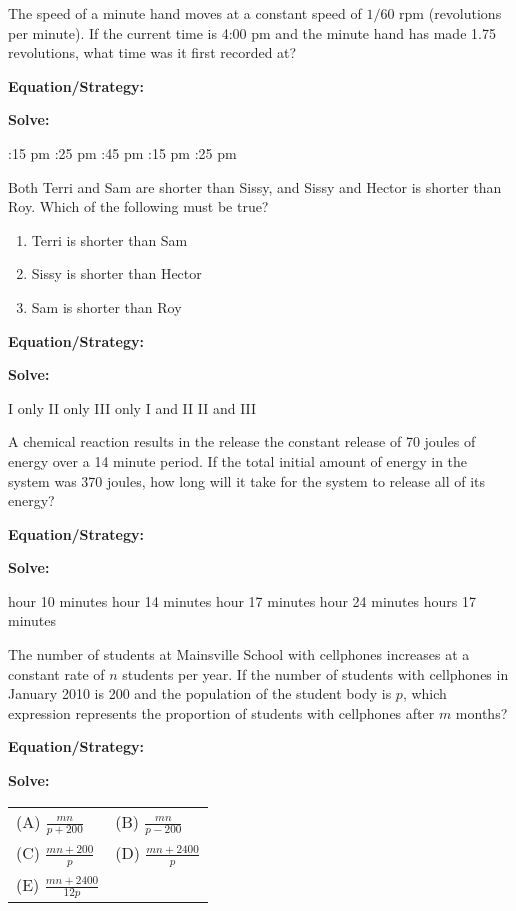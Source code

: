 \vfill
\newpage
\begin{multicols*}{2}
\begin{outline}[enumerate]
\medium

\1 The speed of a minute hand moves at a constant speed of $1/60$ rpm (revolutions per minute). If the current time is 4:00 pm and the minute hand has made 1.75 revolutions, what time was it first recorded at?

\bigskip
\textbf{Equation/Strategy:} \hrulefill

\bigskip
\textbf{Solve:}

\vfill
{}:15 pm
:25 pm
:45 pm
:15 pm
:25 pm

\midline

\1 Both Terri and Sam are shorter than Sissy, and Sissy and Hector is shorter than Roy. Which of the following must be true?

\begin{enumerate}[label=\Roman*.]
\item Terri is shorter than Sam
\item Sissy is shorter than Hector
\item Sam is shorter than Roy
\end{enumerate}

\bigskip
\textbf{Equation/Strategy:} \hrulefill

\bigskip
\textbf{Solve:}

\vfill
\2 I only
\2 II only
\2 III only
\2 I and II
\2 II and III

\columnbreak
\advanced

\1 A chemical reaction results in the release the constant release of 70 joules of energy over a 14 minute period. If the total initial amount of energy in the system was 370 joules, how long will it take for the system to release all of its energy?

\bigskip
\textbf{Equation/Strategy:} \hrulefill

\bigskip
\textbf{Solve:}

\vfill
{} hour 10 minutes
 hour 14 minutes
 hour 17 minutes
 hour 24 minutes
 hours 17 minutes

\midline

\1 The number of students at Mainsville School with cellphones increases at a constant rate of $n$ students per year. If the number of students with cellphones in January 2010 is 200 and the population of the student body is $p$, which expression represents the proportion of students with cellphones after $m$ months?

\bigskip
\textbf{Equation/Strategy:} \hrulefill

\textbf{Solve:}

\vfill
\begin{spacing}{2.75}
\begin{tabularx}{0.4\textwidth}{*2{@{}X}}
(A) $\frac{mn}{p+200}$ & (B) $\frac{mn}{p-200}$\\
(C) $\frac{mn+200}{p}$ & (D) $\frac{mn+2400}{p}$\\
(E) $\frac{mn+2400}{12p}$
\end{tabularx}
\end{spacing}
\end{outline}
\end{multicols*}